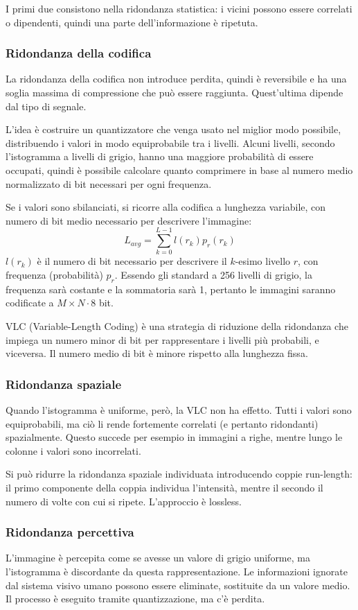 I primi due consistono nella ridondanza statistica: i vicini possono essere correlati o dipendenti, quindi una parte dell'informazione è ripetuta. 

\subsubsection{Ridondanza della codifica}
La ridondanza della codifica non introduce perdita, quindi è reversibile e ha una soglia massima di compressione che può essere raggiunta. Quest'ultima dipende dal tipo di segnale.

L'idea è costruire un quantizzatore che venga usato nel miglior modo possibile, distribuendo i valori in modo equiprobabile tra i livelli. Alcuni livelli, secondo l'istogramma a livelli di grigio, hanno una maggiore probabilità di essere occupati, quindi è possibile calcolare quanto comprimere in base al numero medio normalizzato di bit necessari per ogni frequenza.

Se i valori sono sbilanciati, si ricorre alla codifica a lunghezza variabile, con numero di bit medio necessario per descrivere l'immagine:
$$L_{avg} = \sum_{k=0}^{L-1}l(r_k)p_r(r_k)$$
$l(r_k)$ è il numero di bit necessario per descrivere il $k$-esimo livello $r$, con frequenza (probabilità) $p_r$. Essendo gli standard a 256 livelli di grigio, la frequenza sarà costante e la sommatoria sarà 1, pertanto le immagini saranno codificate a $M\times N \cdot 8$ bit.

VLC (Variable-Length Coding) è una strategia di riduzione della ridondanza che impiega un numero minor di bit per rappresentare i livelli più probabili, e viceversa. Il numero medio di bit è minore rispetto alla lunghezza fissa.

\subsubsection{Ridondanza spaziale}
Quando l'istogramma è uniforme, però, la VLC non ha effetto. Tutti i valori sono equiprobabili, ma ciò li rende fortemente correlati (e pertanto ridondanti) spazialmente. Questo succede per esempio in immagini a righe, mentre lungo le colonne i valori sono incorrelati.

Si può ridurre la ridondanza spaziale individuata introducendo coppie run-length: il primo componente della coppia individua l'intensità, mentre il secondo il numero di volte con cui si ripete. L'approccio è lossless.

\subsubsection{Ridondanza percettiva}
L'immagine è percepita come se avesse un valore di grigio uniforme, ma l'istogramma è discordante da questa rappresentazione.
Le informazioni ignorate dal sistema visivo umano possono essere eliminate, sostituite da un valore medio. Il processo è eseguito tramite quantizzazione, ma c'è perdita. 

